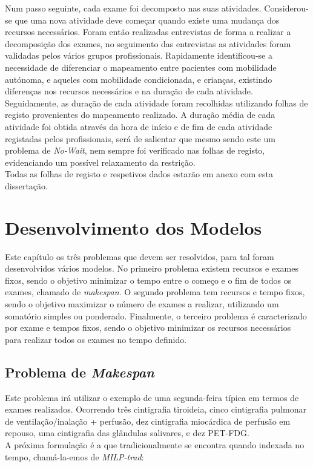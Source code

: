 Num passo seguinte, cada exame foi decomposto nas suas atividades. Considerou-se que uma nova atividade deve começar quando existe uma mudança dos recursos necessários. Foram então realizadas entrevistas de forma a realizar a decomposição dos exames, no seguimento das entrevistas as atividades foram validadas pelos vários grupos profissionais. Rapidamente identificou-se a necessidade de diferenciar o mapeamento entre pacientes com mobilidade autónoma, e aqueles com mobilidade condicionada, e crianças, existindo diferenças nos recursos necessários e na duração de cada atividade.\\
Seguidamente, as duração de cada atividade foram recolhidas utilizando folhas de registo provenientes do mapeamento realizado. A duração média de cada atividade foi obtida através da hora de início e de fim de cada atividade registadas pelos profissionais, será de salientar que mesmo sendo este um problema de \textit{No-Wait}, nem sempre foi verificado nas folhas de registo, evidenciando um possível relaxamento da restrição.\\
Todas as folhas de registo e respetivos dados estarão em anexo com esta dissertação.\\

\chapter{Desenvolvimento dos Modelos}
\label{cha:desenvolvimentos_dos_modelos}

Este capítulo os três problemas que devem ser resolvidos, para tal foram desenvolvidos vários modelos. No primeiro problema existem recursos e exames fixos, sendo o objetivo minimizar o tempo entre o começo e o fim de todos os exames, chamado de \textit{makespan}. O segundo problema tem recursos e tempo fixos, sendo o objetivo maximizar o número de exames a realizar, utilizando um somatório simples ou ponderado. Finalmente, o terceiro problema é caracterizado por exame e tempos fixos, sendo o objetivo minimizar os recursos necessários para realizar todos os exames no tempo definido.

\section{Problema de \textit{Makespan}}

Este problema irá utilizar o exemplo de uma segunda-feira típica em termos de exames realizados. Ocorrendo três cintigrafia tiroideia, cinco cintigrafia pulmonar de ventilação/inalação + perfusão, dez cintigrafia miocárdica de perfusão em repouso, uma cintigrafia das glândulas salivares, e dez PET-FDG.\\
A próxima formulação é a que tradicionalmente se encontra quando indexada no tempo, chamá-la-emos de \textit{MILP-trad}:\\

